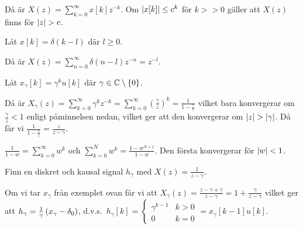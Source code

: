 \documentclass[a4paper]{article}
\begin{document}
Då är \(
    X(z) = \sum_{k=0}^\infty x[k]z^{-k}
\). Om \(
    \abs{x[k]} \leq c^k
\) för \(
    k >> 0
\) gäller att \(
    X(z)
\) finns för \(
    \abs{z} > c
\).

\begin{ex}
    Låt \(
        x[k] = \delta(k-l)
    \) där \(
        l \geq 0
    \).

    Då är \(
        X(z) = \sum_{n=0}^\infty \delta(n-l) z^{-n}
            = z^{-l}
    \). 
\end{ex}

\begin{ex}
    Låt \(
        x_\gamma[k] = \gamma^k u[k]
    \) där \(
        \gamma \in \mathbb{C} \setminus \{0\}
    \).

    Då är \(
        X_\gamma(z) = \sum_{k=0}^\infty \gamma^k z^{-k}
            = \sum_{k=0}^\infty \left(\frac{\gamma}{z} \right)^k
            = \frac{1}{1-\frac{\gamma}{z}} 
    \) vilket bara konvergerar om \(
        \frac{\gamma}{z} < 1
    \) enligt påminnelsen nedan, vilket ger att den konvergerar om \(
        \abs{z} > \abs{\gamma}
    \). Då får vi \(
        \frac{1}{1-\frac{\gamma}{z}} = \frac{z}{z-\gamma} 
    \).
\end{ex}

\begin{påm}
    \(
        \frac{1}{1-w} = \sum_{k=0}^\infty w^k
    \) och \(
        \sum_{k=0}^N w^k = \frac{1-w^{N+1}}{1-w} 
    \). Den första konvergerar för \(
        \abs{w} < 1
    \).
\end{påm}

\begin{ex}
    Finn en diskret och kausal signal \(
        h_\gamma
    \) med \(
        X(z) = \frac{1}{z-\gamma} 
    \).

    Om vi tar \(
        x_\gamma
    \) från exemplet ovan får vi att \(
        X_\gamma(z) = \frac{z-\gamma+\gamma}{z-\gamma} 
            = 1 + \frac{\gamma}{z-\gamma} 
    \) vilket ger att \(
        h_\gamma = \frac{1}{\gamma} \left( x_\gamma - \delta_0 \right)
    \), d.v.s.\ \(
        h_\gamma[k] = 
        \left\{\begin{matrix}
            \gamma^{k-1} & k > 0 \\ 
            0 & k = 0 
        \end{matrix}\right. 
        = x_\gamma[k-1]u[k]
    \).
\end{ex}
\end{document}
